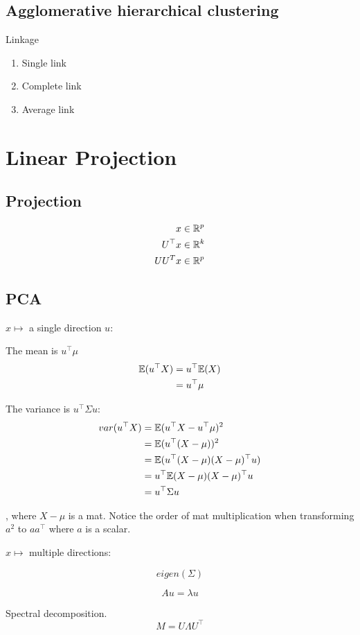 \documentclass[a4paper]{report}
\begin{document}
\section{Agglomerative hierarchical clustering}
Linkage
\begin{enumerate}
\item Single link
\item Complete link 
\item Average link 
\end{enumerate}


\chapter{Linear Projection}
\section{Projection}
\begin{align*}
x &\in \mathbb{R}^p\\
U^\top x &\in \mathbb{R}^k \\
UU^Tx &\in \mathbb{R}^p
\end{align*}

\section{PCA}
$x \mapsto$ a single direction $u$:

The mean is $u^\top\mu$
\begin{align*}
\mathbb{E}(u^\top X) &= u^\top \mathbb{E}(X) \\
&= u^\top \mu
\end{align*}

The variance is $u^\top \Sigma u$:
\begin{align*}
var(u^\top X) &= \mathbb{E}(u^\top X-u^\top \mu)^2\\
&= \mathbb{E}(u^\top(X-\mu))^2\\
&= \mathbb{E}(u^\top(X-\mu)(X-\mu)^\top u)\\
&= u^\top \mathbb{E}(X-\mu)(X-\mu)^\top u  \\
&= u^\top \Sigma u
\end{align*}

, where $X-\mu$ is a mat. Notice the order of mat multiplication when transforming $a^2$ to $aa^\top$ where $a$ is a scalar.

$x \mapsto$ multiple directions:

$$
eigen(\Sigma)
$$

$$
Au = \lambda u
$$

Spectral decomposition. 
$$
M = U\Lambda U^\top
$$
\end{document}
